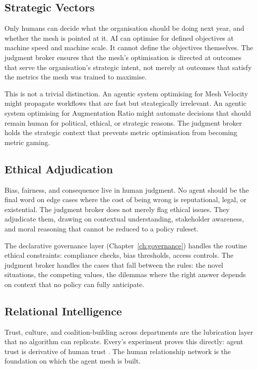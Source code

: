 \subsection{Strategic Vectors}

Only humans can decide what the organisation should be doing next year, and whether the mesh is pointed at it. AI can optimise for defined objectives at machine speed and machine scale. It cannot define the objectives themselves. The judgment broker ensures that the mesh's optimisation is directed at outcomes that serve the organisation's strategic intent, not merely at outcomes that satisfy the metrics the mesh was trained to maximise.

This is not a trivial distinction. An agentic system optimising for Mesh Velocity might propagate workflows that are fast but strategically irrelevant. An agentic system optimising for Augmentation Ratio might automate decisions that should remain human for political, ethical, or strategic reasons. The judgment broker holds the strategic context that prevents metric optimisation from becoming metric gaming.

\subsection{Ethical Adjudication}

Bias, fairness, and consequence live in human judgment. No agent should be the final word on edge cases where the cost of being wrong is reputational, legal, or existential. The judgment broker does not merely flag ethical issues. They adjudicate them, drawing on contextual understanding, stakeholder awareness, and moral reasoning that cannot be reduced to a policy ruleset.

The declarative governance layer (Chapter~\ref{ch:governance}) handles the routine ethical constraints: compliance checks, bias thresholds, access controls. The judgment broker handles the cases that fall between the rules: the novel situations, the competing values, the dilemmas where the right answer depends on context that no policy can fully anticipate.

\subsection{Relational Intelligence}

Trust, culture, and coalition-building across departments are the lubrication layer that no algorithm can replicate. Every's experiment proves this directly: agent trust is derivative of human trust \parencite{Shipper2026}. The human relationship network is the foundation on which the agent mesh is built.

